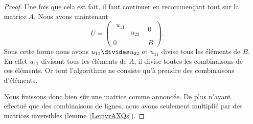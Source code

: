\begin{proof}
    Une fois que cela est fait, il faut continuer en recommençant tout sur la matrice \( A\). Nous avons maintenant
    \begin{equation}
        U=\begin{pmatrix}
            \begin{matrix}
                u_{11}  &       \\
                &   u_{22}
            \end{matrix}&   0    \\
            0    &   B
        \end{pmatrix}.
    \end{equation}
    Sous cette forme nous avons \( u_{11}\divides u_{22}\) et \( u_{11}\) divise tous les éléments de \( B\). En effet \( u_{11}\) divisant tous les éléments de \( A\), il divise toutes les combinaisons de ces éléments. Or tout l'algorithme ne consiste qu'à prendre des combinaisons d'éléments.

    Nous finissons donc bien sûr une matrice comme annoncée. De plus n'ayant effectué que des combinaisons de lignes, nous avons seulement multiplié par des matrices inversibles (lemme~\ref{LemyrAXQs}).
\end{proof}
